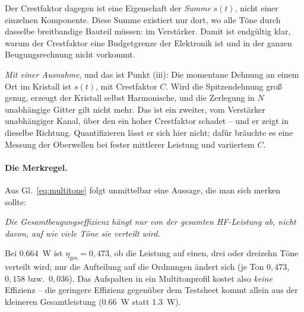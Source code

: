 \documentclass[11pt,a4paper]{article}
\newcommand{\crest}{\ensuremath{C}}
\begin{document}
Der Crestfaktor dagegen ist eine Eigenschaft der \emph{Summe} $s(t)$, nicht
einer einzelnen Komponente. Diese Summe existiert nur dort, wo alle Töne
durch dasselbe breitbandige Bauteil müssen: im Verstärker. Damit ist
endgültig klar, warum der Crestfaktor eine Budgetgrenze der Elektronik ist
und in der ganzen Beugungsrechnung nicht vorkommt.

\medskip
\noindent\emph{Mit einer Ausnahme}, und das ist Punkt (iii): Die momentane
Dehnung an einem Ort im Kristall ist $s(t)$, mit Crestfaktor $\crest$. Wird
die Spitzendehnung groß genug, erzeugt der Kristall selbst Harmonische, und
die Zerlegung in $N$ unabhängige Gitter gilt nicht mehr. Das ist ein
zweiter, vom Verstärker unabhängiger Kanal, über den ein hoher Crestfaktor
schadet -- und er zeigt in dieselbe Richtung. Quantifizieren lässt er sich
hier nicht; dafür bräuchte es eine Messung der Oberwellen bei fester
mittlerer Leistung und variiertem $\crest$.

\paragraph{Die Merkregel.}
Aus Gl.~\eqref{eq:multitone} folgt unmittelbar eine Aussage, die man sich
merken sollte:

\begin{center}
\emph{Die Gesamtbeugungseffizienz hängt nur von der gesamten HF-Leistung ab,
nicht davon, auf wie viele Töne sie verteilt wird.}
\end{center}

\noindent Bei \SI{0.664}{\watt} ist $\eta_\mathrm{ges}=0{,}473$, ob die
Leistung auf einen, drei oder dreizehn Töne verteilt wird; nur die Aufteilung
auf die Ordnungen ändert sich (je Ton $0{,}473$, $0{,}158$ bzw.\ $0{,}036$).
Das Aufspalten in ein Multitonprofil kostet also \emph{keine} Effizienz -- die
geringere Effizienz gegenüber dem Testsheet kommt allein aus der kleineren
Gesamtleistung (\SI{0.66}{\watt} statt \SI{1.3}{\watt}).
\end{document}
